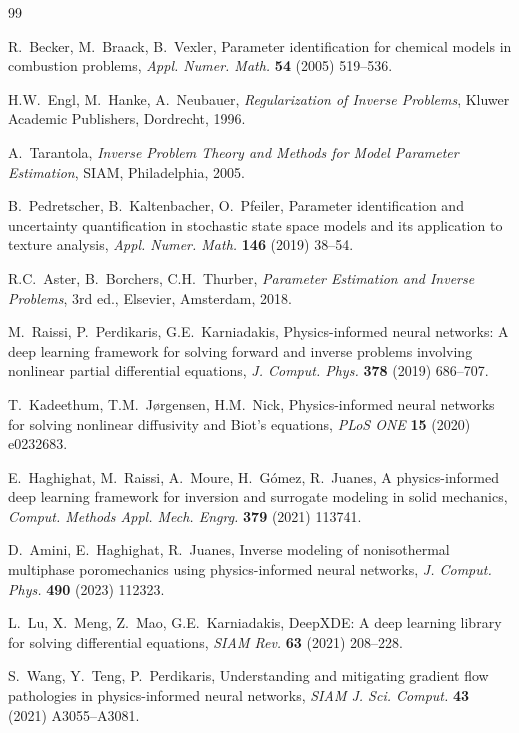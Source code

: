 \documentclass[preprint,12pt]{elsarticle}
\begin{document}
\begin{thebibliography}{99}

R.~Becker, M.~Braack, B.~Vexler,
Parameter identification for chemical models in combustion problems,
\textit{Appl. Numer. Math.} \textbf{54} (2005) 519--536.

H.W.~Engl, M.~Hanke, A.~Neubauer,
\textit{Regularization of Inverse Problems},
Kluwer Academic Publishers, Dordrecht, 1996.

A.~Tarantola,
\textit{Inverse Problem Theory and Methods for Model Parameter Estimation},
SIAM, Philadelphia, 2005.

B.~Pedretscher, B.~Kaltenbacher, O.~Pfeiler,
Parameter identification and uncertainty quantification in stochastic state space models and its application to texture analysis,
\textit{Appl. Numer. Math.} \textbf{146} (2019) 38--54.

R.C.~Aster, B.~Borchers, C.H.~Thurber,
\textit{Parameter Estimation and Inverse Problems}, 3rd ed.,
Elsevier, Amsterdam, 2018.

M.~Raissi, P.~Perdikaris, G.E.~Karniadakis,
Physics-informed neural networks: A deep learning framework for solving forward and inverse problems involving nonlinear partial differential equations,
\textit{J. Comput. Phys.} \textbf{378} (2019) 686--707.

T.~Kadeethum, T.M.~J{\o}rgensen, H.M.~Nick,
Physics-informed neural networks for solving nonlinear diffusivity and Biot's equations,
\textit{PLoS ONE} \textbf{15} (2020) e0232683.

E.~Haghighat, M.~Raissi, A.~Moure, H.~G{\'o}mez, R.~Juanes,
A physics-informed deep learning framework for inversion and surrogate modeling in solid mechanics,
\textit{Comput. Methods Appl. Mech. Engrg.} \textbf{379} (2021) 113741.

D.~Amini, E.~Haghighat, R.~Juanes,
Inverse modeling of nonisothermal multiphase poromechanics using physics-informed neural networks,
\textit{J. Comput. Phys.} \textbf{490} (2023) 112323.

L.~Lu, X.~Meng, Z.~Mao, G.E.~Karniadakis,
DeepXDE: A deep learning library for solving differential equations,
\textit{SIAM Rev.} \textbf{63} (2021) 208--228.

S.~Wang, Y.~Teng, P.~Perdikaris,
Understanding and mitigating gradient flow pathologies in physics-informed neural networks,
\textit{SIAM J. Sci. Comput.} \textbf{43} (2021) A3055--A3081.


\end{thebibliography}
\end{document}
